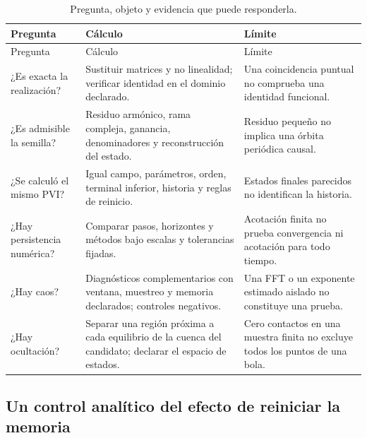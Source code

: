 \begin{longtable}{L{.21\linewidth}L{.35\linewidth}L{.35\linewidth}}
\caption{Pregunta, objeto y evidencia que puede responderla.}
\label{tab:revision-preguntas}\\
\toprule
Pregunta & Cálculo & Límite\\\midrule
\endfirsthead
\toprule Pregunta & Cálculo & Límite\\\midrule
\endhead
¿Es exacta la realización? & Sustituir matrices y no linealidad; verificar
identidad en el dominio declarado. & Una coincidencia puntual no comprueba
una identidad funcional.\\
¿Es admisible la semilla? & Residuo armónico, rama compleja, ganancia,
denominadores y reconstrucción del estado. & Residuo pequeño no implica una
órbita periódica causal.\\
¿Se calculó el mismo PVI? & Igual campo, parámetros, orden, terminal inferior,
historia y reglas de reinicio. & Estados finales parecidos no
identifican la historia.\\
¿Hay persistencia numérica? & Comparar pasos, horizontes y métodos bajo
escalas y tolerancias fijadas. & Acotación finita no prueba convergencia ni
acotación para todo tiempo.\\
¿Hay caos? & Diagnósticos complementarios con ventana, muestreo y memoria
declarados; controles negativos. & Una FFT o un exponente estimado aislado
no constituye una prueba.\\
¿Hay ocultación? & Separar una región próxima a cada equilibrio de la
cuenca del candidato; declarar el espacio de estados. & Cero contactos en
una muestra finita no excluye todos los puntos de una bola.\\
\bottomrule
\end{longtable}

\subsection{Un control analítico del efecto de reiniciar la memoria}

